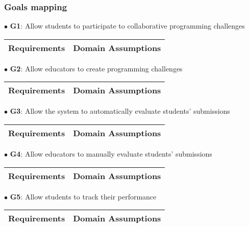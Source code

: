 \subsubsection{Goals mapping}
$\bullet$ \textbf{G1}: Allow students to participate to collaborative programming challenges
\begin{center}
    \begin{tabular}{ |c|c| }
        \hline
        \textbf{Requirements} & \textbf{Domain Assumptions} \\
        \hline
    \end{tabular}
\end{center}
$\bullet$ \textbf{G2}: Allow educators to create programming challenges
\begin{center}
    \begin{tabular}{ |c|c| }
        \hline
        \textbf{Requirements} & \textbf{Domain Assumptions} \\
        \hline
    \end{tabular}
\end{center}
$\bullet$ \textbf{G3}: Allow the system to automatically evaluate students' submissions
\begin{center}
    \begin{tabular}{ |c|c| }
        \hline
        \textbf{Requirements} & \textbf{Domain Assumptions} \\
        \hline
    \end{tabular}
\end{center}
$\bullet$ \textbf{G4}: Allow educators to manually evaluate students' submissions
\begin{center}
    \begin{tabular}{ |c|c| }
        \hline
        \textbf{Requirements} & \textbf{Domain Assumptions} \\
        \hline
    \end{tabular}
\end{center}
$\bullet$ \textbf{G5}: Allow students to track their performance
\begin{center}
    \begin{tabular}{ |c|c| }
        \hline
        \textbf{Requirements} & \textbf{Domain Assumptions} \\
        \hline
    \end{tabular}
\end{center}


